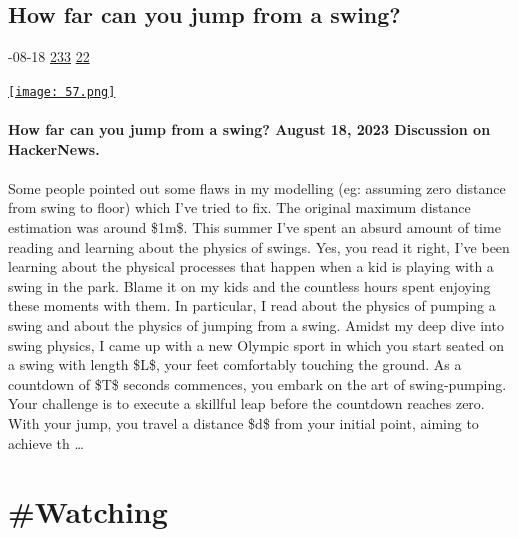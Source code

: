 \documentclass[10pt,a4paper]{article}
\begin{document}
\begin{multicols}{2}
\begin{minipage}{\linewidth}
\subsection{How far can you jump from a swing?}
\textsc{\footnotesize
{\scriptsize\faCalendar}-08-18 
{\scriptsize\faThumbsOUp}\space 
\href{http://news.ycombinator.com/item?id=37313493\&utm\_term=comment}{233} 
{\scriptsize\faComments}\space 
\href{http://news.ycombinator.com/item?id=37313493\&utm\_term=comment}{22} 
}
\par\medskip\noindent
\href{https://www.alexmolas.com/2023/08/18/how-far-can-you-jump.html?utm\_source=hackernewsletter\&utm\_medium=email\&utm\_term=learn}{
    \texttt{[image: 57.png]}
}
\end{minipage}
\paragraph{}
\textbf{How far can you jump from a swing?
August 18, 2023
Discussion on HackerNews.}
\paragraph{}

Some people pointed out some flaws in my modelling (eg: assuming zero distance from swing to floor) which I’ve tried to fix. The original maximum distance estimation was around \$1m\$.
This summer I’ve spent an absurd amount of time reading and learning about the physics of swings. Yes, you read it right, I’ve been learning about the physical processes that happen when a kid is playing with a swing in the park. Blame it on my kids and the countless hours spent enjoying these moments with them. In particular, I read about the physics of pumping a swing and about the physics of jumping from a swing. Amidst my deep dive into swing physics, I came up with a new Olympic sport in which you start seated on a swing with length \$L\$, your feet comfortably touching the ground. As a countdown of \$T\$ seconds commences, you embark on the art of swing-pumping. Your challenge is to execute a skillful leap before the countdown reaches zero. With your jump, you travel a distance \$d\$ from your initial point, aiming to achieve th
\dots\par
\end{multicols}

\newpage
\section{\#Watching}
\end{document}
